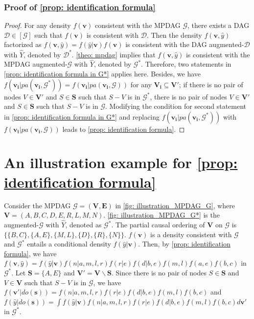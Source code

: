 \documentclass{article} %
\begin{document}
\subsubsection{Proof of \cref{prop: identification formula}}
\begin{proof}
For any density $f(\mathbf{v})$ consistent with the MPDAG $\mathcal{G}$, there exists a DAG $\mathcal{D} \in [\mathcal{G}]$ such that $f(\mathbf{v})$ is consistent with $\mathcal{D}$. Then the density $f(\mathbf{v}, \hat{y})$ factorized as $f(\mathbf{v}, \hat{y}) = f(\hat{y}|\mathbf{v})f(\mathbf{v})$ is consistent with the DAG augmented-$\mathcal{D}$ with $\hat{Y}$, denoted by $\mathcal{D^*}$. \cref{theo: mpdag} implies that $f(\mathbf{v}, \hat{y})$ is consistent with the MPDAG augmented-$\mathcal{G}$ with $\hat{Y}$, denoted by $\mathcal{G^*}$. Therefore, two statements in \cref{prop: identification formula in G*} applies here. Besides, we have $f(\mathbf{v_i}|pa(\mathbf{v_i}, \mathcal{G}^*)) = f(\mathbf{v_i}|pa(\mathbf{v_i}, \mathcal{G}))$ for any $\mathbf{V_{i} \subseteq \mathbf{V'}}$; if there is no pair of nodes $V \in \mathbf{V'}$ and $S \in \mathbf{S}$ such that $S-V$ is in $\mathcal{G^*}$, there is no pair of nodes $V \in \mathbf{V'}$ and $S \in \mathbf{S}$ such that $S-V$ is in $\mathcal{G}$. Modifying the condition for second statement in \cref{prop: identification formula in G*} and replacing $f(\mathbf{v_i}|pa(\mathbf{v_i}, \mathcal{G}^*))$ with $f(\mathbf{v_i}|pa(\mathbf{v_i}, \mathcal{G}))$ leads to \cref{prop: identification formula}.
\end{proof}


\section{An illustration example for \cref{prop: identification formula}} \label{Appendix: An illustration example}

Consider the MPDAG $\mathcal{G}=(\mathbf{V}, \mathbf{E})$ in \cref{fig: illustration_MPDAG_G}, where $\mathbf{V}=(A,B,C,D,E,R,L,M,N)$. \cref{fig: illustration_MPDAG_G*} is the augmented-$\mathcal{G}$ with $\hat{Y}$, denoted as $\mathcal{G}^*$. The partial causal ordering of $\mathbf{V}$ on $\mathcal{G}$ is $\{\{B,C\}, \{A,E\}, \{M,L\}, \{D\}, \{R\}, \{N\}\}$. $f(\mathbf{v})$ is a density consistent with $\mathcal{G}$ and $\mathcal{G^*}$ entails a conditional density $f(\hat{y}|\mathbf{v})$. Then, by \cref{prop: identification formula}, we have $f(\mathbf{v}, \hat{y})=f(\hat{y}|\mathbf{v})f(n|a,m,l,r)f(r|e)f(d|b,e)f(m,l)f(a,e)f(b,c)$ in $\mathcal{G^*}$. Let $\mathbf{S}=\{A,E\}$ and $\mathbf{V'}=\mathbf{V} \backslash \mathbf{S}$.  Since there is no pair of nodes $S \in \mathbf{S}$ and $V \in \mathbf{V}$ such that $S - V$ is in $\mathcal{G}$, we have $f(\mathbf{v'}|do(\mathbf{s}))=f(n|a,m,l,r)f(r|e)f(d|b,e)f(m,l)f(b,c)$ and $f(\hat{y}|do(\mathbf{s}))=\int f(\hat{y}|\mathbf{v})f(n|a,m,l,r)f(r|e)f(d|b,e)f(m,l)f(b,c) d \mathbf{v'}$ in $\mathcal{G^*}$.
\end{document}
